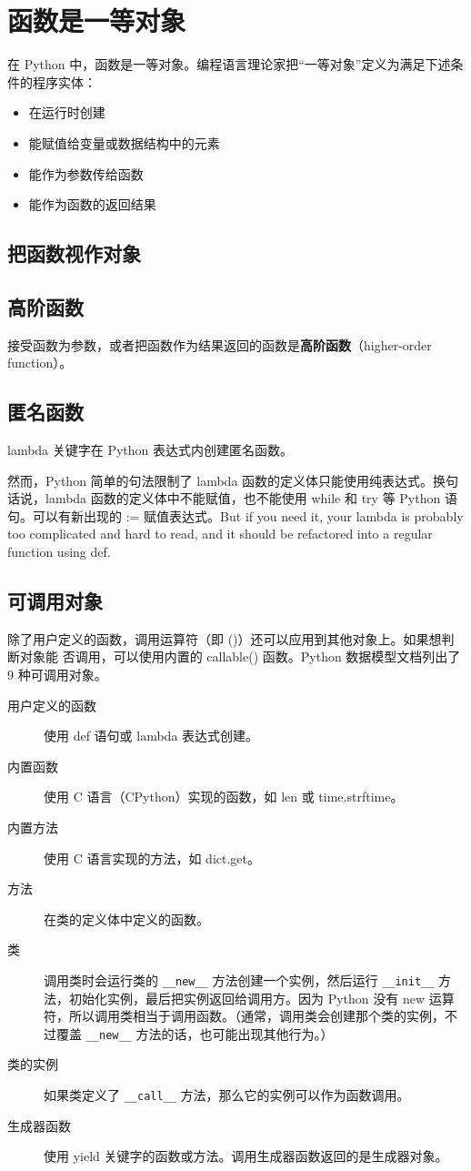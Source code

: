 \chapter{函数是一等对象}
在 Python 中，函数是一等对象。编程语言理论家把“一等对象”定义为满足下述条件的程序实体：
\begin{itemize}
    \item 在运行时创建
    \item 能赋值给变量或数据结构中的元素
    \item 能作为参数传给函数
    \item 能作为函数的返回结果
\end{itemize}
\section{把函数视作对象}
\section{高阶函数}
接受函数为参数，或者把函数作为结果返回的函数是\textbf{高阶函数}（higher-order function）。
\section{匿名函数}
lambda 关键字在 Python 表达式内创建匿名函数。

然而，Python 简单的句法限制了 lambda 函数的定义体只能使用纯表达式。换句话说，lambda 函数的定义体中不能赋值，也不能使用 while 和 try 等 Python 语句。可以有新出现的 := 赋值表达式。But if you need
it, your lambda is probably too complicated and hard to read, and it should be refactored into a regular function using def.
\section{可调用对象}
除了用户定义的函数，调用运算符（即 ()）还可以应用到其他对象上。如果想判断对象能
否调用，可以使用内置的 callable() 函数。Python 数据模型文档列出了 9 种可调用对象。
\begin{description}
    \item[用户定义的函数] 使用 def 语句或 lambda 表达式创建。
    \item[内置函数] 使用 C 语言（CPython）实现的函数，如 len 或 time.strftime。
    \item[内置方法] 使用 C 语言实现的方法，如 dict.get。
    \item[方法] 在类的定义体中定义的函数。
    \item[类] 调用类时会运行类的 \verb|__new__| 方法创建一个实例，然后运行 \verb|__init__| 方法，初始化实例，最后把实例返回给调用方。因为 Python 没有 new 运算符，所以调用类相当于调用函数。（通常，调用类会创建那个类的实例，不过覆盖 \verb|__new__| 方法的话，也可能出现其他行为。）
    \item[类的实例] 如果类定义了 \verb|__call__| 方法，那么它的实例可以作为函数调用。
    \item[生成器函数] 使用 yield 关键字的函数或方法。调用生成器函数返回的是生成器对象。
\end{description}
